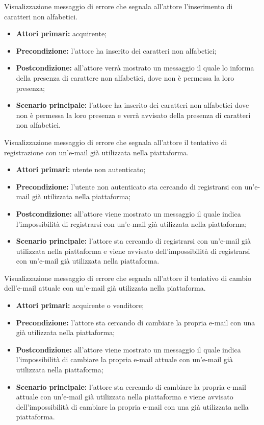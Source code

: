 Visualizzazione messaggio di errore che segnala all'attore l'inserimento di caratteri non alfabetici.
\begin{itemize}
    \item \textbf{Attori primari:} acquirente;
    \item \textbf{Precondizione:} l'attore ha inserito dei caratteri non alfabetici;
    \item \textbf{Postcondizione:} all'attore verrà mostrato un messaggio il quale lo informa della presenza di carattere non alfabetici, dove non è permessa la loro presenza;
    \item \textbf{Scenario principale:} l'attore ha inserito dei caratteri non alfabetici dove non è permessa la loro presenza e verrà avvisato della presenza di caratteri non alfabetici.
\end{itemize}

Visualizzazione messaggio di errore che segnala all'attore il tentativo di registrazione con un'e-mail già utilizzata nella piattaforma.
\begin{itemize}
    \item \textbf{Attori primari:} utente non autenticato;
    \item \textbf{Precondizione:} l'utente non autenticato sta cercando di registrarsi con un'e-mail già utilizzata nella piattaforma;
    \item \textbf{Postcondizione:} all'attore viene mostrato un messaggio il quale indica l'impossibilità di registrarsi con un'e-mail già utilizzata nella piattaforma;
    \item \textbf{Scenario principale:} l'attore sta cercando di registrarsi con un'e-mail già utilizzata nella piattaforma e viene avvisato dell'impossibilità di registrarsi con un'e-mail già utilizzata nella piattaforma.
\end{itemize}

Visualizzazione messaggio di errore che segnala all'attore il tentativo di cambio dell'e-mail attuale con un'e-mail già utilizzata nella piattaforma.
\begin{itemize}
    \item \textbf{Attori primari:} acquirente o venditore;
    \item \textbf{Precondizione:} l'attore sta cercando di cambiare la propria e-mail con una già utilizzata nella piattaforma;
    \item \textbf{Postcondizione:} all'attore viene mostrato un messaggio il quale indica l'impossibilità di cambiare la propria e-mail attuale con un'e-mail già utilizzata nella piattaforma;
    \item \textbf{Scenario principale:} l'attore sta cercando di cambiare la propria e-mail attuale con un'e-mail già utilizzata nella piattaforma e viene avvisato dell'impossibilità di cambiare la propria e-mail con una già utilizzata nella piattaforma.
\end{itemize}

